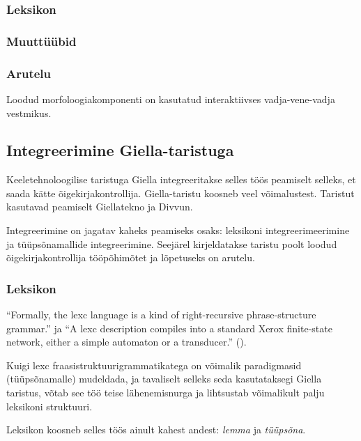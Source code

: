 \documentclass[12pt,a4paper]{article}
\begin{document}
\subsubsection{Leksikon}
\label{sec:gf-leksikon}

\subsubsection{Muuttüübid}
\label{sec:gf-muuttüübid}

\subsubsection{Arutelu}
\label{sec:gf-arutelu}

Loodud morfoloogiakomponenti on kasutatud interaktiivses vadja-vene-vadja vestmikus.





\subsection{Integreerimine Giella-taristuga}

Keeletehnoloogilise taristuga Giella integreeritakse selles töös peamiselt selleks, et saada kätte õigekirja\-kontrollija. Giella-taristu koosneb veel võimalustest. Taristut kasutavad peamiselt Giellatekno ja Divvun.

Integreerimine on jagatav kaheks peamiseks osaks: leksikoni integreerimeerimine ja tüüpsõnamallide integreerimine. Seejärel kirjeldatakse taristu poolt loodud õigekirjakontrollija tööpõhimõtet ja lõpetuseks on arutelu.

\subsubsection{Leksikon}
\label{sec:giella-leksikon}

``Formally, the lexc language is a kind of right-recursive phrase-structure 
grammar.'' ja ``A lexc description compiles into a standard Xerox finite-state network, either a simple automaton or a transducer.'' (\cite[lk~203]{beesley_finite_2003}).

Kuigi lexc fraasi\-struktuuri\-grammatikatega on võimalik paradigmasid (tüüpsõnamalle) mudeldada, ja tavaliselt selleks seda kasutataksegi Giella taristus, võtab see töö teise lähenemisnurga ja lihtsustab võimalikult palju leksikoni struktuuri.

Leksikon koosneb selles töös ainult kahest andest: \textit{lemma} ja \textit{tüüpsõna}. 
\end{document}
